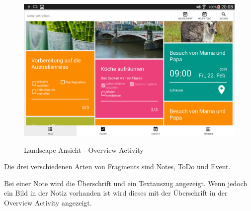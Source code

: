 \begin{figure}[H]
\centering
\begin{minipage}[t]{1\textwidth} %
\caption{Landscape Ansicht - Overview Activity} %
\includegraphics[width=1\textwidth]{img/Landscape}\\ %
\end{minipage}
\end{figure}

Die drei verschiedenen Arten von Fragments sind Notes, ToDo und Event.

Bei einer Note wird die Überschrift und ein Textauszug angezeigt. Wenn jedoch ein Bild in der Notiz vorhanden ist wird dieses mit der Überschrift in der Overview Activity angezeigt.

